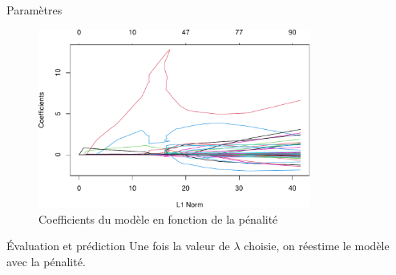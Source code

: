 \documentclass[
  ignorenonframetext,
]{beamer}
\newenvironment{Shaded}{\begin{snugshade}}{\end{snugshade}}
\newcommand{\AttributeTok}[1]{\textcolor[rgb]{0.40,0.45,0.13}{#1}}
\newcommand{\CommentTok}[1]{\textcolor[rgb]{0.37,0.37,0.37}{#1}}
\newcommand{\DecValTok}[1]{\textcolor[rgb]{0.68,0.00,0.00}{#1}}
\newcommand{\FunctionTok}[1]{\textcolor[rgb]{0.28,0.35,0.67}{#1}}
\newcommand{\NormalTok}[1]{\textcolor[rgb]{0.00,0.23,0.31}{#1}}
\newcommand{\OtherTok}[1]{\textcolor[rgb]{0.00,0.23,0.31}{#1}}
\newcommand{\SpecialCharTok}[1]{\textcolor[rgb]{0.37,0.37,0.37}{#1}}
\begin{document}
\begin{frame}{Paramètres}
\protect\hypertarget{paramuxe8tres}{}
\begin{figure}

{\centering \includegraphics[width=0.8\textwidth,height=\textheight]{MATH60602-diapos5_files/figure-beamer/fig-lassopath-1.pdf}

}

\caption{\label{fig-lassopath}Coefficients du modèle en fonction de la
pénalité}

\end{figure}
\end{frame}

\begin{frame}[fragile]{Évaluation et prédiction}
\protect\hypertarget{uxe9valuation-et-pruxe9diction}{}
Une fois la valeur de \(\lambda\) choisie, on réestime le modèle avec la
pénalité.

\begin{Shaded}
\end{Shaded}
\end{frame}
\end{document}
